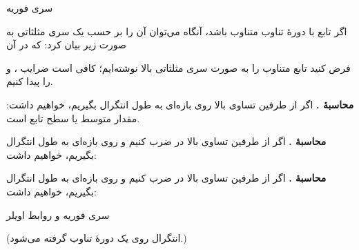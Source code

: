 \begin{EMtheorem}{سری فوریه}

اگر تابع  با دورهٔ تناوب \EMim{2\pi} متناوب باشد، آنگاه می‌توان آن را بر حسب یک سری مثلثاتی به صورت زیر بیان کرد:
که در آن

\end{EMtheorem}

\begin{EMproof}

فرض کنید تابع متناوب را به صورت سری مثلثاتی بالا نوشته‌ایم؛ کافی است ضرایب ،  و  را پیدا کنیم.

\textbf{محاسبهٔ .} اگر از طرفین تساوی بالا روی بازه‌ای به طول \EMim{2\pi} انتگرال بگیریم، خواهیم داشت:
 مقدار متوسط یا سطح  تابع است.

\textbf{محاسبهٔ .} اگر از طرفین تساوی بالا در  ضرب کنیم و روی بازه‌ای به طول \EMim{2\pi} انتگرال بگیریم، خواهیم داشت:

\textbf{محاسبهٔ .} اگر از طرفین تساوی بالا در  ضرب کنیم و روی بازه‌ای به طول \EMim{2\pi} انتگرال بگیریم، خواهیم داشت:

\end{EMproof}

\begin{EMimportant}{سری فوریه و روابط اویلر}

(انتگرال روی یک دورهٔ تناوب \EMim{2\pi} گرفته می‌شود.)

\end{EMimportant}

